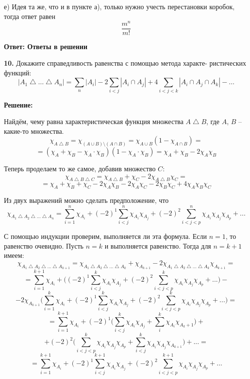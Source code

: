\documentclass[a4paper,12pt]{article} %
\begin{document}
е) Идея та же, что и в пункте а), только нужно учесть перестановки коробок, тогда ответ равен
\[\frac{m^n}{m!}\]


\begin{flushright}
\begin{large}
\textbf {Ответ: Ответы в решении}
\end{large}
\end{flushright}

{\bf 10.} Докажите справедливость равенства с помощью метода характе-
ристических функций: \[ | A_1\bigtriangleup \dots \bigtriangleup A_n | = \sum\limits_n |A_i| - 2 \sum\limits_{i < j}|A_i \cap A_j| + 4 \sum\limits_{i<j<k}|A_i\cap A_j \cap A_k| - \dots \]
\begin{center}
\bfseries
{\Large Решение: }
\end{center}

Найдём, чему равна характеристическая функция множества $A\bigtriangleup B$, где $A$, $B$ -- какие-то множества.
\[\chi_{A\bigtriangleup B} = \chi_{(A \cup B) \setminus (A \cap B)} = \chi_{A\cup B}(1 - \chi_{A\cap B}) =\]
\[ = (\chi_A + \chi_B - \chi_A \cdot \chi_B )(1 - \chi_A \cdot \chi_B) = \chi_A + \chi_B - 2\chi_A\chi_B\]

Теперь проделаем то же самое, добавив множество $C$:
\[\chi_{A\bigtriangleup B \bigtriangleup C} = \chi_{A\bigtriangleup B} + \chi_C - 2\chi_{A\bigtriangleup B}\chi_C =\]
\[ = \chi_A + \chi_B + \chi_C - 2\chi_A\chi_B - 2\chi_A\chi_C - 2\chi_B\chi_C + 4\chi_A\chi_B\chi_C\]

Из двух выражений можно сделать предположение, что
\[\chi_{A_1 \bigtriangleup A_2 \bigtriangleup ... \bigtriangleup A_n} = \sum_{i=1}^n \chi_{A_i} + (-2)^1\sum_{i < j}^n \chi_{A_i}\chi_{A_j} + (-2)^2\sum_{i < j < p}^n \chi_{A_i}\chi_{A_j}\chi_{A_p} + ...\]

С помощью индукции проверим, выполняется ли эта формула. Если $n=1$, то равенство очевидно. Пусть $n=k$ и выполняется равенство. Тогда для $n=k+1$ имеем:
\[\chi_{A_1 \bigtriangleup A_2 \bigtriangleup ... \bigtriangleup A_{k+1}} =\chi_{A_1 \bigtriangleup A_2 \bigtriangleup ... \bigtriangleup A_k} + \chi_{A_{k+1}} - 2\chi_{A_1 \bigtriangleup A_2 \bigtriangleup ... \bigtriangleup A_k} \chi_{A_{k+1}} =\]
\[= \sum_{i=1}^{k+1} \chi_{A_i} + \Big((-2)^1\sum_{i < j}^k \chi_{A_i}\chi_{A_j} + (-2)^2\sum_{i < j < p}^k \chi_{A_i}\chi_{A_j}\chi_{A_p} + ...\Big) - \]
\[-2 \chi_{A_{k+1}}\Big(\sum_{i=1}^{k} \chi_{A_i}+ (-2)^1\sum_{i < j}^k \chi_{A_i}\chi_{A_j} + (-2)^2\sum_{i < j < p}^k \chi_{A_i}\chi_{A_j}\chi_{A_p} + ...\Big) =\]
\[= \sum_{i=1}^{k+1} \chi_{A_i} +(-2)^1\Big(\sum_{i < j}^k \chi_{A_i}\chi_{A_j} + \sum_{i}^k \chi_{A_i}\chi_{A_k+1}\Big) +\]
\[+ (-2)^2\Big( \sum_{i < j < p}^k \chi_{A_i}\chi_{A_j}\chi_{A_p} + \sum_{i < j}^k \chi_{A_i}\chi_{A_j}\chi_{A_{k+1}}\Big) + ... = \]
\[= \sum_{i=1}^{k+1} \chi_{A_i} + (-2)^1\sum_{i < j}^{k+1} \chi_{A_i}\chi_{A_j} + (-2)^2\sum_{i < j < p}^{k+1} \chi_{A_i}\chi_{A_j}\chi_{A_p} + ...\]
\end{document}
